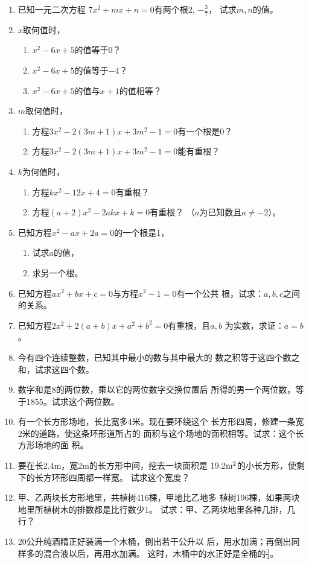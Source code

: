 \begin{enumerate}
\item 已知一元二次方程
$7x^2+mx+n=0$有两个根$2$, $-\frac{3}{7}$，
试求$m,n$的值。

\item $x$取何值时，
\begin{enumerate}
    \item $x^2-6x+5$的值等于0？
    \item $x^2-6x+5$的值等于$-4$？
    \item $x^2-6x+5$的值与$x+1$的值相等？
\end{enumerate}

\item $m$取何值时，
\begin{enumerate}
    \item 方程$3x^2-2(3m+1)x+3m^2-1=0$有一个根是0？
    \item 方程$3x^2-2(3m+1)x+3m^2-1=0$能有重根？
\end{enumerate}

\item $k$为何值时，
\begin{enumerate}
    \item 方程$kx^2-12x+4=0$有重根？
    \item 方程$(a+2)x^2-2akx+k=0$有重根？
（$a$为已知数且$a\ne-2$）。
\end{enumerate}

\item 已知方程$x^2-ax+2a=0$的一个根是1，
\begin{enumerate}
    \item 试求$a$的值，
    \item 求另一个根。
\end{enumerate}

\item 已知方程$ax^2+bx+c=0$与方程$x^2-1=0$有一个公共
根，试求：$a,b,c$之间的关系。
\item 已知方程$2x^2+2(a+b)x+a^2+b^2=0$有重根，且$a,b$
为实数，求证：$a=b$。
\item 今有四个连续整数，已知其中最小的数与其中最大的
数之积等于这四个数之和，试求这四个数。
\item 数字和是8的两位数，乘以它的两位数字交换位置后
所得的男一个两位数，等于1855。试求这个两位数。
\item 有一个长方形场地，长比宽多4米。现在要环绕这个
长方形四周，修建一条宽2米的道路，使这条环形道所占的
面积与这个场地的面积相等。试求：这个长方形场地的面
积。
\item 要在长2.4m，宽2m的长方形中间，挖去一块面积是
19.2${\rm m^2}$的小长方形，使剩下的长方环形四周都一样宽。
试求这个宽度？
\item 甲、乙两块长方形地里，共植树416棵，甲地比乙地多
植树196棵，如果两块地里所植树木的排数都是比行数少1。
试求：甲、乙两块地里各种几排，几行？
\item 20公升纯酒精正好装满一个木桶，倒出若干公升以
后，用水加满；再倒出同样多的混合液以后，再用水加满。
这时，木桶中的水正好是全桶的$\frac{3}{4}$。


\end{enumerate}
